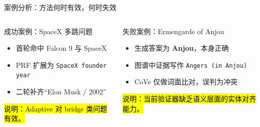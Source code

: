 \begin{frame}{案例分析：方法何时有效，何时失效}
  \begin{columns}[T,onlytextwidth]
    \begin{exampleblock}{成功案例：SpaceX 多跳问题}
      \begin{itemize}
        \item 首轮命中 Falcon 9 与 SpaceX
        \item PRF 扩展为 \texttt{SpaceX founder year}
        \item 二轮补齐“Elon Musk / 2002”
      \end{itemize}
      \hl{说明：Adaptive 对 bridge 类问题有效。}
    \end{exampleblock}

    \begin{alertblock}{失败案例：Ermengarde of Anjou}
      \begin{itemize}
        \item 生成答案为 \textbf{Anjou}，本身正确
        \item 图谱中证据写作 \texttt{Angers (in Anjou)}
        \item CoVe 仅做词面比对，误判为冲突
      \end{itemize}
      \hl{说明：当前验证器缺乏语义层面的实体对齐能力。}
    \end{alertblock}
  \end{columns}
\end{frame}
